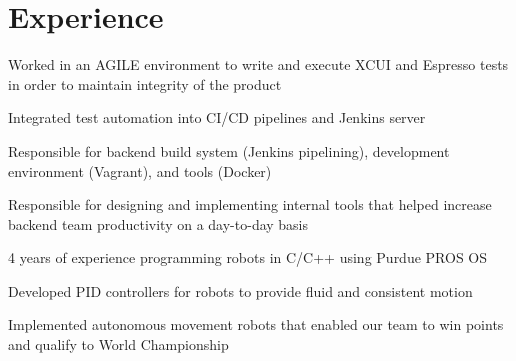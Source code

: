 \documentclass[]{deedy-resume-openfont}
\begin{document}
\begin{minipage}[t]{0.66\textwidth} 


\section{Experience}

\vspace{\topsep} %
\begin{tightemize}
\item Worked in an AGILE environment to write and execute XCUI and Espresso tests in order to maintain integrity of the product
\item Integrated test automation into CI/CD pipelines and Jenkins server
\item Responsible for backend build system (Jenkins pipelining), development environment (Vagrant), and tools (Docker)
\item Responsible for designing and implementing internal tools that helped increase backend team productivity on a day-to-day basis

\end{tightemize}
\sectionsep
{}
\vspace{\topsep} %
\begin{tightemize}
\item 4 years of experience programming robots in C/C++ using Purdue PROS OS
\item Developed PID controllers for robots to provide fluid and consistent motion
\item Implemented autonomous movement robots that enabled our team to win points and qualify to World Championship

\end{tightemize}
\sectionsep



\end{minipage}
\end{document}
